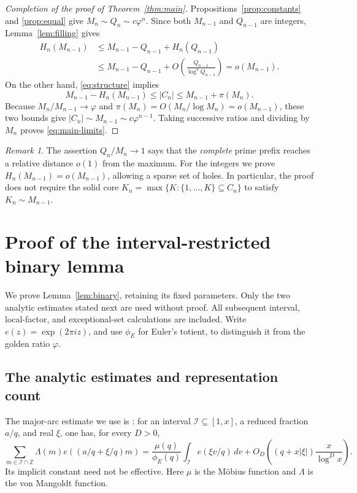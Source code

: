 \documentclass[11pt,letterpaper]{article}
\numberwithin{equation}{section}
\theoremstyle{remark}
\newtheorem{remark}[theorem]{Remark}
\newcommand{\Z}{\mathbb Z}
\newcommand{\ph}{\varphi}
\newcommand{\tot}{\phi_{\!E}}
\newcommand{\ee}[1]{e\!\left(#1\right)}
\begin{document}
\begin{proof}[Completion of the proof of Theorem~\ref{thm:main}]
Propositions~\ref{prop:constants} and \ref{prop:equal} give
$M_n\sim Q_n\sim c\ph^n$. Since both $M_{n-1}$ and $Q_{n-1}$
are integers, Lemma~\ref{lem:filling} gives
\begin{align*}
 H_n(M_{n-1})
 &\le M_{n-1}-Q_{n-1}+H_n(Q_{n-1})\\
 &\le M_{n-1}-Q_{n-1}
       +O\left(\frac{Q_{n-1}}{\log^4Q_{n-1}}\right)
 =o(M_{n-1}).
\end{align*}
On the other hand, \eqref{eq:structure} implies
\[
 M_{n-1}-H_n(M_{n-1})\le |C_n|\le M_{n-1}+\pi(M_n).
\]
Because $M_n/M_{n-1}\to\ph$ and
$\pi(M_n)=O(M_n/\log M_n)=o(M_{n-1})$, these two bounds give
$|C_n|\sim M_{n-1}\sim c\ph^{n-1}$. Taking successive ratios and
dividing by $M_n$ proves \eqref{eq:main-limits}.
\end{proof}

\begin{remark}
The assertion $Q_n/M_n\to1$ says that the \emph{complete} prime
prefix reaches a relative distance $o(1)$ from the maximum. For the
integers we prove $H_n(M_{n-1})=o(M_{n-1})$, allowing a sparse set
of holes. In particular, the proof does not require the solid core
$K_n=\max\{K:\{1,\ldots,K\}\subseteq C_n\}$ to satisfy
$K_n\sim M_{n-1}$.
\end{remark}

\appendix
\section{Proof of the interval-restricted binary lemma}\label{app:binary}

We prove Lemma~\ref{lem:binary}, retaining its fixed parameters.
Only the two analytic estimates stated next are used without proof.
All subsequent interval, local-factor, and exceptional-set calculations
are included. Write $e(z)=\exp(2\pi iz)$, and use $\tot$ for Euler's
totient, to distinguish it from the golden ratio $\ph$.

\subsection{The analytic estimates and representation count}

The major-arc estimate we use is \cite[Proposition~24]{Tao}:
for an interval $\mathcal I\subseteq[1,x]$, a reduced fraction $a/q$,
and real $\xi$, one has, for every $D>0$,
\begin{equation}\label{eq:tao-input}
 \sum_{m\in\mathcal I\cap\Z}\Lambda(m)
       \ee{(a/q+\xi/q)m}
 =\frac{\mu(q)}{\tot(q)}\int_{\mathcal I}\ee{\xi v/q}\,dv
 +O_D\left((q+x|\xi|)\frac{x}{\log^D x}\right).
\end{equation}
Its implicit constant need not be effective. Here $\mu$ is the
M\"obius function and $\Lambda$ is the von Mangoldt function.
\end{document}

